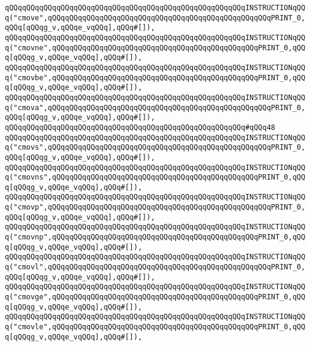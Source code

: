 \verb|qQQqqQQqqQQqqQQqqQQqqQQqqQQqqQQqqQQqqQQqqQQqqQQqqQQqqQQqINSTRUCTIONqQQq("cmove",qQQqqQQqqQQqqQQqqQQqqQQqqQQqqQQqqQQqqQQqqQQqqQQqqQQqPRINT_0,qQQq[qQQqg_v,qQQqe_vqQQq],qQQq#[]),|\newline
\verb|qQQqqQQqqQQqqQQqqQQqqQQqqQQqqQQqqQQqqQQqqQQqqQQqqQQqqQQqINSTRUCTIONqQQq("cmovne",qQQqqQQqqQQqqQQqqQQqqQQqqQQqqQQqqQQqqQQqqQQqqQQqPRINT_0,qQQq[qQQqg_v,qQQqe_vqQQq],qQQq#[]),|\newline
\verb|qQQqqQQqqQQqqQQqqQQqqQQqqQQqqQQqqQQqqQQqqQQqqQQqqQQqqQQqINSTRUCTIONqQQq("cmovbe",qQQqqQQqqQQqqQQqqQQqqQQqqQQqqQQqqQQqqQQqqQQqqQQqPRINT_0,qQQq[qQQqg_v,qQQqe_vqQQq],qQQq#[]),|\newline
\verb|qQQqqQQqqQQqqQQqqQQqqQQqqQQqqQQqqQQqqQQqqQQqqQQqqQQqqQQqINSTRUCTIONqQQq("cmova",qQQqqQQqqQQqqQQqqQQqqQQqqQQqqQQqqQQqqQQqqQQqqQQqqQQqPRINT_0,qQQq[qQQqg_v,qQQqe_vqQQq],qQQq#[]),|\newline
\verb|qQQqqQQqqQQqqQQqqQQqqQQqqQQqqQQqqQQqqQQqqQQqqQQqqQQqqQQq#qQQq48|\newline
\verb|qQQqqQQqqQQqqQQqqQQqqQQqqQQqqQQqqQQqqQQqqQQqqQQqqQQqqQQqINSTRUCTIONqQQq("cmovs",qQQqqQQqqQQqqQQqqQQqqQQqqQQqqQQqqQQqqQQqqQQqqQQqqQQqPRINT_0,qQQq[qQQqg_v,qQQqe_vqQQq],qQQq#[]),|\newline
\verb|qQQqqQQqqQQqqQQqqQQqqQQqqQQqqQQqqQQqqQQqqQQqqQQqqQQqqQQqINSTRUCTIONqQQq("cmovns",qQQqqQQqqQQqqQQqqQQqqQQqqQQqqQQqqQQqqQQqqQQqqQQqPRINT_0,qQQq[qQQqg_v,qQQqe_vqQQq],qQQq#[]),|\newline
\verb|qQQqqQQqqQQqqQQqqQQqqQQqqQQqqQQqqQQqqQQqqQQqqQQqqQQqqQQqINSTRUCTIONqQQq("cmovp",qQQqqQQqqQQqqQQqqQQqqQQqqQQqqQQqqQQqqQQqqQQqqQQqqQQqPRINT_0,qQQq[qQQqg_v,qQQqe_vqQQq],qQQq#[]),|\newline
\verb|qQQqqQQqqQQqqQQqqQQqqQQqqQQqqQQqqQQqqQQqqQQqqQQqqQQqqQQqINSTRUCTIONqQQq("cmovnp",qQQqqQQqqQQqqQQqqQQqqQQqqQQqqQQqqQQqqQQqqQQqqQQqPRINT_0,qQQq[qQQqg_v,qQQqe_vqQQq],qQQq#[]),|\newline
\verb|qQQqqQQqqQQqqQQqqQQqqQQqqQQqqQQqqQQqqQQqqQQqqQQqqQQqqQQqINSTRUCTIONqQQq("cmovl",qQQqqQQqqQQqqQQqqQQqqQQqqQQqqQQqqQQqqQQqqQQqqQQqqQQqPRINT_0,qQQq[qQQqg_v,qQQqe_vqQQq],qQQq#[]),|\newline
\verb|qQQqqQQqqQQqqQQqqQQqqQQqqQQqqQQqqQQqqQQqqQQqqQQqqQQqqQQqINSTRUCTIONqQQq("cmovge",qQQqqQQqqQQqqQQqqQQqqQQqqQQqqQQqqQQqqQQqqQQqqQQqPRINT_0,qQQq[qQQqg_v,qQQqe_vqQQq],qQQq#[]),|\newline
\verb|qQQqqQQqqQQqqQQqqQQqqQQqqQQqqQQqqQQqqQQqqQQqqQQqqQQqqQQqINSTRUCTIONqQQq("cmovle",qQQqqQQqqQQqqQQqqQQqqQQqqQQqqQQqqQQqqQQqqQQqqQQqPRINT_0,qQQq[qQQqg_v,qQQqe_vqQQq],qQQq#[]),|\newline

